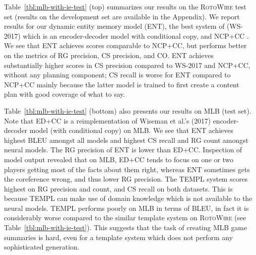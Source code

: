 \documentclass[11pt,a4paper]{article}
\begin{document}
Table~\ref{tbl:mlb-with-ie-test} (top) summarizes our results on the
\textsc{RotoWire} test set (results on the development set are
available in the Appendix). We report results for our dynamic entity
memory model (ENT), the best system of  (WS-2017)
which is an encoder-decoder model with conditional copy, and NCP+CC
\cite{DBLP:journals/corr/abs-1809-00582}.
We see that ENT achieves scores comparable to NCP+CC, but performs
better on the metrics of RG precision, CS precision, and CO.  ENT
achieves substantially higher scores in CS precision compared to
\mbox{WS-2017} and NCP+CC, without any planning component; CS recall
is worse for ENT compared to NCP+CC mainly because the latter model is
trained to first create a content plan with good coverage of what to
say.



Table~\ref{tbl:mlb-with-ie-test} (bottom) also presents our results on
MLB (test set). Note that ED+CC is a reimplementation of Wiseman et
al.'s (2017) encoder-decoder model (with conditional copy) on MLB.  We
see that ENT achieves highest BLEU amongst all models and highest CS
recall and RG count amongst neural models.  The RG precision of ENT is
lower than ED+CC.  Inspection of model output revealed that on MLB,
ED+CC tends to focus on one or two players getting most of the facts
about them right, whereas ENT sometimes gets the coreference wrong,
and thus lower RG precision.  The TEMPL system scores highest on RG
precision and count, and CS recall on both datasets. This is because
TEMPL can make use of domain knowledge which is not available to the
neural models.  TEMPL performs poorly on MLB in terms of BLEU, in fact
it is considerably worse compared to the similar template system on
\textsc{RotoWire} (see Table~\ref{tbl:mlb-with-ie-test}). This
suggests that the task of creating MLB game summaries is hard, even
for a template system which does not perform any sophisticated
generation.
\end{document}
